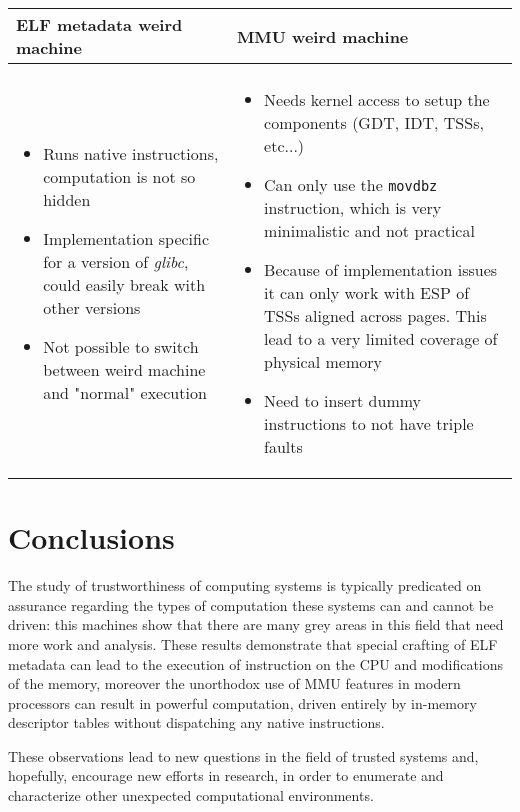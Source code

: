 \documentclass[11pt,twoside,a4paper]{article}
\begin{document}
\begin{longtable}{ p{} | p{} }
\bfseries{ELF metadata weird machine} & \bfseries{MMU weird machine} \\ \hline \\
\begin{itemize}
\item Runs native instructions, computation is not so hidden
\item Implementation specific for a version of \emph{glibc}, could easily break with other versions
\item Not possible to switch between weird machine and "normal" execution
\end{itemize}
&
\begin{itemize}
\item Needs kernel access to setup the components (GDT, IDT, TSSs, etc...)
\item Can only use the \texttt{movdbz} instruction, which is very minimalistic and not practical
\item Because of implementation issues it can only work with ESP of TSSs aligned across pages. This lead to a very limited coverage of physical memory
\item Need to insert dummy instructions to not have triple faults 
\end{itemize} \\

\end{longtable}


\section{Conclusions}

The study of trustworthiness of computing systems is typically predicated on assurance regarding the types of computation these systems can and cannot be driven: this machines show that there are many grey areas in this field that need more work and analysis.
These results demonstrate that special crafting of ELF metadata can lead to the execution of instruction on the CPU and modifications of the memory, moreover the unorthodox use of MMU features in modern processors can result in powerful computation, driven entirely by in-memory descriptor tables without dispatching any native instructions.

These observations lead to new questions in the field of trusted systems and, hopefully, encourage new efforts in research, in order to enumerate and characterize other unexpected computational environments.
\end{document}
